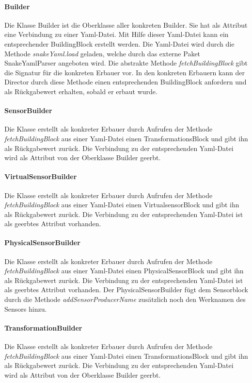 \documentclass[parskip=full]{scrartcl}
\begin{document}
\paragraph{Builder}
Die Klasse Builder ist die Oberklasse aller konkreten Builder. Sie hat als Attribut eine Verbindung zu einer Yaml-Datei. Mit Hilfe dieser Yaml-Datei kann ein entsprechender BuildingBlock erstellt werden. Die Yaml-Datei wird durch die Methode \textit{snakeYaml.load} geladen, welche durch das externe Paket SnakeYamlParser angeboten wird. Die abstrakte Methode \textit{fetchBuildingBlock} gibt die Signatur für die konkreten Erbauer vor. In den konkreten Erbauern kann der Director durch diese Methode einen entsprechenden BuildingBlock anfordern und als Rückgabewert erhalten, sobald er erbaut wurde. 

\paragraph{SensorBuilder}
Die Klasse erstellt als konkreter Erbauer durch Aufrufen der Methode \textit{fetchBuildingBlock} aus einer Yaml-Datei einen TransformationsBlock und gibt ihn als Rückgabewert zurück. Die Verbindung zu der entsprechenden Yaml-Datei wird als Attribut von der Oberklasse Builder geerbt.


\paragraph{VirtualSensorBuilder}
Die Klasse erstellt als konkreter Erbauer durch Aufrufen der Methode \textit{fetchBuildingBlock} aus einer Yaml-Datei einen VirtualsensorBlock und gibt ihn als Rückgabewert zurück. Die Verbindung zu der entsprechenden Yaml-Datei ist als geerbtes Attribut vorhanden.
\paragraph{PhysicalSensorBuilder}
Die Klasse erstellt als konkreter Erbauer durch Aufrufen der Methode \textit{fetchBuildingBlock} aus einer Yaml-Datei einen PhysicalSensorBlock und gibt ihn als Rückgabewert zurück. Die Verbindung zu der entsprechenden Yaml-Datei ist als geerbtes Attribut vorhanden. Der PhysicalSensorBuilder fügt dem Sensorblock durch die Methode \textit{addSensorProducerName} zusätzlich noch den Werknamen des Sensors hinzu.
\paragraph{TransformationBuilder}
Die Klasse erstellt als konkreter Erbauer durch Aufrufen der Methode \textit{fetchBuildingBlock} aus einer Yaml-Datei einen TransformationsBlock und gibt ihn als Rückgabewert zurück. Die Verbindung zu der entsprechenden Yaml-Datei wird als Attribut von der Oberklasse Builder geerbt.
\end{document}
